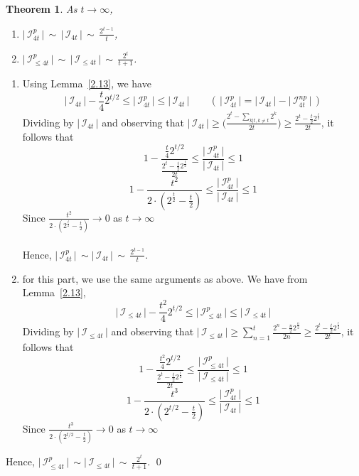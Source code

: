\documentclass[a4paper,12pt]{amsart}
\renewenvironment{proof}{{\bfseries Proof.}}{\qed}
\numberwithin{equation}{section}
\newtheorem{theorem}{Theorem}[section]
\theoremstyle{definition}
\newcommand{\lemref}[1]{Lemma~\ref{#1}}
\numberwithin{equation}{section}
\begin{document}
\begin{theorem}\label{2.14} As $t \to \infty$, 
   \begin{enumerate}
       \item  $ \lvert\,\mathscr{I}^p_{4t}\,\rvert\, \sim \,\lvert\,\mathscr{I}_{4t}\,\rvert\,\sim\,\frac{2^{t-1}}{t}$, 
       \item $ \lvert\,\mathscr{I}^p_{\leq4t}\,\rvert\, \sim \,\lvert\,\mathscr{I}_{\leq4t}\,\rvert\,\sim\,\frac{2^{t}}{t+1}$. 
       \end{enumerate}
\end{theorem}
\begin{proof}
\begin{enumerate}
    \item    Using \lemref{2.13}, we have
    $$\lvert\,\mathscr{I}_{4t}\,\rvert - \frac{t}{4}2^{t/2}\leq \lvert\,\mathscr{I}^p_{4t}\,\rvert \leq \lvert\,\mathscr{I}_{4t}\,\rvert \quad\quad  (\,\lvert\,\mathscr{I}^p_{4t}\,\rvert=\lvert\,\mathscr{I}_{4t}\,\rvert-\lvert\,\mathscr{I}^{np}_{4t}\,\rvert \,)$$ 
    Dividing by $\lvert\,\mathscr{I}_{4t}\,\rvert$ and observing that $\lvert\, \mathscr{I}_{4t}\,\rvert\geq \bigg(\frac{2^t-\sum_{k \lvert t, k \neq t}2^k}{2t}\bigg)\geq\frac{2^t-\frac{t}{2}2^\frac{t}{2}}{2t} $, it follows that
    $$1 - \frac{\frac{t}{4}2^{t/2}}{\frac{2^t-\frac{t}{2}2^\frac{t}{2}}{2t}}\leq \frac{\lvert\,\mathscr{I}^p_{4t}\,\rvert}{\lvert\,\mathscr{I}_{4t}\,\rvert} \leq 1 $$
    $$1 - \frac{t^2}{2\cdot(2^\frac{t}{2}-\frac{t}{2})}\leq \frac{\lvert\,\mathscr{I}^p_{4t}\,\rvert}{\lvert\,\mathscr{I}_{4t}\,\rvert} \leq 1$$
    Since $\frac{t^2}{2\cdot(2^\frac{t}{2}-\frac{t}{2})} \to 0$ as $t \to \infty$
    \\
    \\
    Hence,  $\lvert\,\mathscr{I}^p_{4t}\,\rvert\, \sim \lvert\,\mathscr{I}_{4t}\,\rvert\,\sim\,\frac{2^{t-1}}{t}.$
    \item for this part, we use the same arguments as above. We have from \lemref{2.13},
    $$\lvert\,\mathscr{I}_{\leq4t}\,\rvert - \frac{t^2}{4}2^{t/2}\leq \lvert\,\mathscr{I}^p_{\leq4t}\,\rvert \leq \lvert\,\mathscr{I}_{\leq4t}\,\rvert$$
     Dividing by $\lvert\,\mathscr{I}_{\leq4t}\,\rvert$ and observing that $\lvert \,\mathscr{I}_{\leq 4t}\,\rvert \geq \sum_{n=1}^{t}\frac{2^n-\frac{n}{2}2^\frac{n}{2}}{2n} \geq \frac{2^t-\frac{t}{2}2^\frac{t}{2}}{2t} $, it follows that
     $$1 - \frac{\frac{t^2}{4}2^{t/2}}{\frac{2^t-\frac{t}{2}2^\frac{t}{2}}{2t} }\leq \frac{\lvert\,\mathscr{I}^p_{\leq4t}\,\rvert}{\lvert\,\mathscr{I}_{\leq4t}\,\rvert} \leq 1 $$
     $$1 - \frac{t^3}{2\cdot(2^{t/2}-\frac{t}{2})}\leq \frac{\lvert\,\mathscr{I}^p_{4t}\,\rvert}{\lvert\,\mathscr{I}_{4t}\,\rvert} \leq 1$$
     Since $\frac{t^3}{2\cdot(2^{t/2}-\frac{t}{2})} \to 0$ as $t \to \infty$
         \end{enumerate}

     Hence,  $\lvert\,\mathscr{I}^p_{\leq4t}\,\rvert\, \sim \lvert\,\mathscr{I}_{\leq4t}\,\rvert\,\sim\,\frac{2^{t}}{t+1}.$
    \end{proof}
\end{document}
